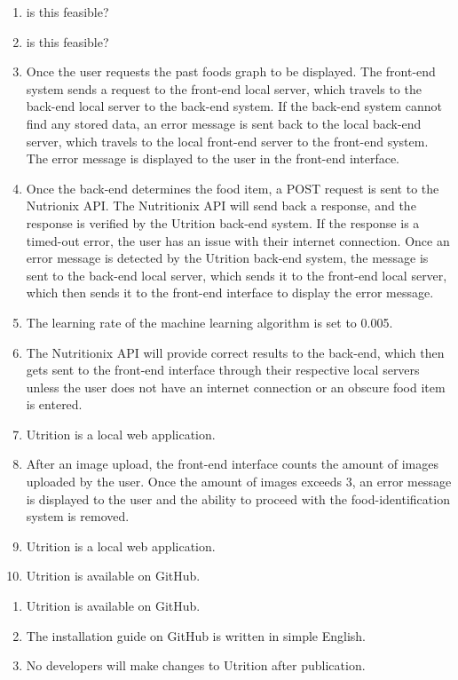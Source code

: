 \documentclass[12pt, titlepage]{article}
\begin{document}
\begin{enumerate}[{PR}1. ]
	\item is this feasible?
	\item is this feasible?
	\item Once the user requests the past foods graph to be displayed. The front-end system sends a request to the front-end local server, which travels to the back-end local server to the back-end system. If the back-end system cannot find any stored data, an error message is sent back to the local back-end server, which travels to the local front-end server to the front-end system. The error message is displayed to the user in the front-end interface.
	\item Once the back-end determines the food item, a POST request is sent to the Nutrionix API. The Nutritionix API will send back a response, and the response is verified by the Utrition back-end system. If the response is a timed-out error, the user has an issue with their internet connection. Once an error message is detected by the Utrition back-end system, the message is sent to the back-end local server, which sends it to the front-end local server, which then sends it to the front-end interface to display the error message.
	\item The learning rate of the machine learning algorithm is set to 0.005.
	\item The Nutritionix API will provide correct results to the back-end, which then gets sent to the front-end interface through their respective local servers unless the user does not have an internet connection or an obscure food item is entered.
	\item Utrition is a local web application.
	\item After an image upload, the front-end interface counts the amount of images uploaded by the user. Once the amount of images exceeds 3, an error message is displayed to the user and the ability to proceed with the food-identification system is removed.
	\item Utrition is a local web application.
	\item Utrition is available on GitHub.
\end{enumerate}

\begin{enumerate}[{OE}1. ]
	\item Utrition is available on GitHub.
	\item The installation guide on GitHub is written in simple English.
	\item No developers will make changes to Utrition after publication.
\end{enumerate}
\end{document}
